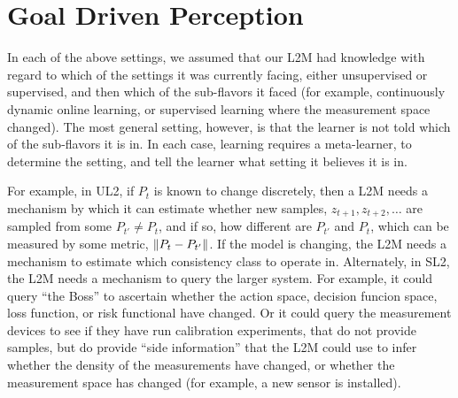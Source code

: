 \documentclass{article}
\begin{document}




\section{Goal Driven Perception}
\label{sec:perception}




In each of the above settings, we assumed that our L2M had  knowledge with regard to which of the  settings it was currently facing, either unsupervised or supervised, and then which of the sub-flavors it faced (for example, continuously dynamic online learning, or supervised learning where the measurement space changed).  The most general setting, however, is that the learner is not told which of the sub-flavors it is in.  In each case, learning requires a meta-learner, to determine the setting, and tell the learner what setting it believes it is in. 

For example, in UL2,  if $P_t$ is known to change discretely, then a L2M needs a mechanism by which it can estimate whether  new samples, $z_{t+1}, z_{t+2},\ldots$ are sampled from some $P_{t'} \neq P_t$, and if so, how different are $P_{t'}$ and $P_t$, which can be measured by some metric, $\left \lVert P_t - P_{t'} \right \rVert$.  If the model is changing, the L2M needs a mechanism to estimate which consistency class to operate in. Alternately, in SL2, the L2M needs a mechanism to query the larger system.  For example, it could query ``the Boss'' to ascertain whether the action space, decision funcion space, loss function, or risk functional have changed.  Or it could query the measurement devices to see if they have run calibration experiments, that do not provide samples, but do provide ``side information'' that the L2M could use to infer whether the density of the measurements have changed, or whether the measurement space has changed (for example, a new sensor is installed).  
\end{document}
